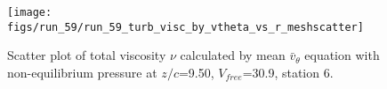 \begin{figure}[H]
\centering
\texttt{[image: figs/run\_59/run\_59\_turb\_visc\_by\_vtheta\_vs\_r\_meshscatter]}
\caption{Scatter plot of total viscosity $\nu$ calculated by mean $\bar{v}_{\theta}$ equation with non-equilibrium pressure at $z/c$=9.50, $V_{free}$=30.9, station 6.}
\label{fig:run_59_turb_visc_by_vtheta_vs_r_meshscatter}
\end{figure}


